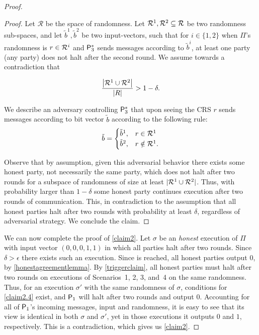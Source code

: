\begin{proof}
	
	\begin{proof}
	 Let $\mathcal{R}$ be the space of randomness. Let $\mathcal{R}^1,\mathcal{R}^2 \subseteq \mathcal{R}$ be two randomness sub-spaces, and let $\tilde{b}^1, \tilde{b}^2$ be two input-vectors, such that for $i \in \{1,2\}$ when $\Pi$'s randomness is $r \in \mathcal{R}^i$ and $\mathsf{P}_3^\ast$ sends messages according to $\tilde{b}^i$, at least one party (any party) does not halt after the second round. We assume towards a contradiction that

	\[
	\frac{\left|\mathcal{R}^1 \cup \mathcal{R}^2\right|}{\left|R\right|} > 1 - \delta.
	\]

We describe an adversary controlling $\mathsf{P}_3^\ast$ that upon seeing the CRS $r$ sends messages according to bit vector $\tilde{b}$ according to the following rule:
	  \[
	  \tilde{b} =   \begin{cases}
	  \tilde{b}^1, & r \in \mathcal{R}^1 \\
	  \tilde{b}^2, & r \notin \mathcal{R}^1.
	  \end{cases}
	  \]
	
	Observe that by assumption, given this adversarial behavior there exists some honest party, not necessarily the same party, which does not halt after two rounds for a subspace of randomness of size at least $|\mathcal{R}^1 \cup \mathcal{R}^2|$. Thus, with probability larger than $1-\delta$ some honest party continues execution after two rounds of communication. This, in contradiction to the assumption that all honest parties halt after two rounds with probability at least $\delta$, regardless of adversarial strategy. We conclude the claim.
	\end{proof}
	
	We can now complete the proof of \cref{claim2}. Let $\sigma$ be an \emph{honest} execution of $\Pi$ with input vector $(0,0,0,1,1)$ in which all parties halt after two rounds. Since $\delta > \epsilon$ there exists such an execution. Since \agr is reached, all honest parties output $0$, by \cref{honestagreementlemma}. By \cref{triggerclaim}, all honest parties must halt after two rounds on executions of Scenarios~1, 2, 3, and~4 on the same randomness. Thus, for an execution $\sigma'$ with the same randomness of $\sigma$, conditions for \cref{claim2.4} exist, and $\mathsf{P}_1$ will halt after two rounds and output $0$. Accounting for all of $\mathsf{P}_1$'s incoming messages, input and randomness, it is easy to see that its view is identical in both $\sigma$ and $\sigma'$, yet in those executions it outputs $0$ and $1$, respectively. This is a contradiction, which gives us \cref{claim2}.
	
\end{proof}

